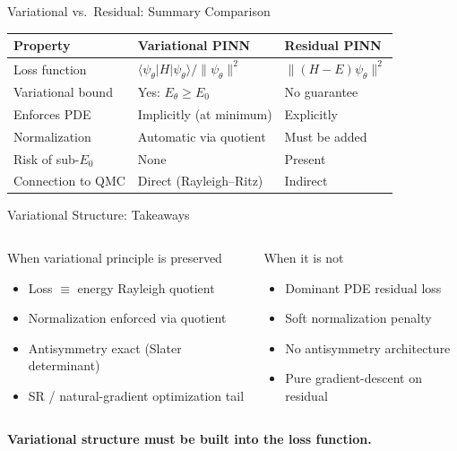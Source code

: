 \documentclass[aspectratio=169,10pt]{beamer}
\begin{document}
\begin{frame}{Variational vs.\ Residual: Summary Comparison}
  \renewcommand{\arraystretch}{1.35}
  \begin{tabular}{p{3.2cm} p{4.0cm} p{4.0cm}}
    \toprule
    \textbf{Property} & \textbf{Variational PINN} & \textbf{Residual PINN} \\
    \midrule
    Loss function      & $\langle\psi_\theta|H|\psi_\theta\rangle/\|\psi_\theta\|^2$
                       & $\|(H-E)\psi_\theta\|^2$ \\
    Variational bound  & \alert{Yes}: $E_\theta\geq E_0$ & No guarantee \\
    Enforces PDE       & Implicitly (at minimum)   & Explicitly \\
    Normalization      & Automatic via quotient    & Must be added \\
    Risk of sub-$E_0$  & None                      & Present \\
    Connection to QMC  & Direct (Rayleigh--Ritz)   & Indirect \\
    \bottomrule
  \end{tabular}
\end{frame}

\begin{frame}{Variational Structure: Takeaways}
  \begin{columns}[T]
      \begin{block}{When variational principle is preserved}
        \begin{itemize}
          \item Loss $\equiv$ energy Rayleigh quotient
          \item Normalization enforced via quotient
          \item Antisymmetry exact (Slater determinant)
          \item SR / natural-gradient optimization tail
        \end{itemize}
      \end{block}
      \begin{alertblock}{When it is not}
        \begin{itemize}
          \item Dominant PDE residual loss
          \item Soft normalization penalty
          \item No antisymmetry architecture
          \item Pure gradient-descent on residual
        \end{itemize}
      \end{alertblock}
  \end{columns}

  \vspace{0.4cm}
  \begin{center}
    \large
    \textbf{Variational structure must be built into the loss function.}
  \end{center}
\end{frame}
\end{document}
